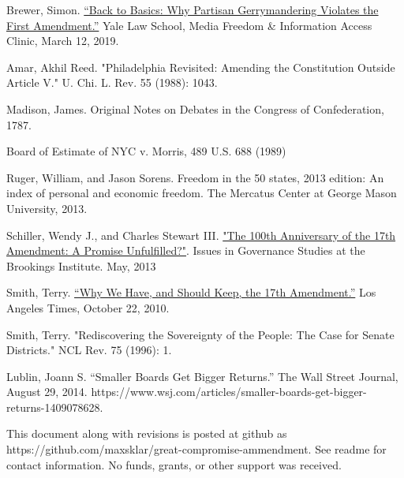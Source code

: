 \documentclass{article}
\begin{document}
\begin{thebibliography}{20}
Brewer, Simon. \href{https://law.yale.edu/mfia/case-disclosed/back-basics-why-partisan-gerrymandering-violates-first-amendment. }{“Back to Basics: Why Partisan Gerrymandering Violates the First Amendment.”} Yale Law School, Media Freedom \& Information Access Clinic, March 12, 2019.

Amar, Akhil Reed. "Philadelphia Revisited: Amending the Constitution Outside Article V." U. Chi. L. Rev. 55 (1988): 1043.

Madison, James. Original Notes on Debates in the Congress of Confederation, 1787.

Board of Estimate of NYC v. Morris, 489 U.S. 688 (1989)

Ruger, William, and Jason Sorens. Freedom in the 50 states, 2013 edition: An index of personal and economic freedom. The Mercatus Center at George Mason University, 2013.

Schiller, Wendy J., and Charles Stewart III. \href{https://www.brookings.edu/wp-content/uploads/2016/06/Schiller_17th-Amendment_v7.pdf}{"The 100th Anniversary of the 17th Amendment:
A Promise Unfulfilled?"}. Issues in Governance Studies at the Brookings Institute. May, 2013

Smith, Terry. \href{https://www.latimes.com/archives/la-xpm-2010-oct-22-la-oew-smith-17th-amendment-20101022-story.html}{“Why We Have, and Should Keep, the 17th Amendment.”} Los Angeles Times, October 22, 2010.

Smith, Terry. "Rediscovering the Sovereignty of the People: The Case for Senate Districts." NCL Rev. 75 (1996): 1.

Lublin, Joann S. “Smaller Boards Get Bigger Returns.” The Wall Street Journal, August 29, 2014. https://www.wsj.com/articles/smaller-boards-get-bigger-returns-1409078628. 

\end{thebibliography}

This document along with revisions is posted at github as https://github.com/maxsklar/great-compromise-ammendment. See readme for contact information. No funds, grants, or other support was received.
\end{document}
